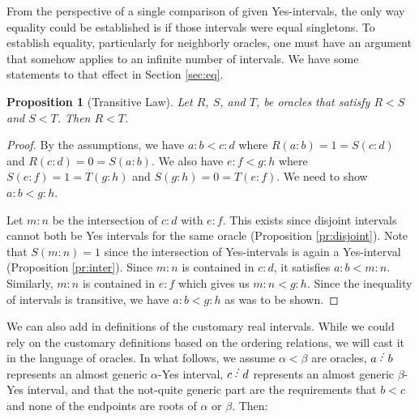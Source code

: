 \documentclass[12pt]{article}
\newtheorem{proposition}{Proposition}[subsection]
\begin{document}
From the perspective of a single comparison of given Yes-intervals, the only way equality could be established is if those intervals were equal singletons. To establish equality, particularly for neighborly oracles, one must have an argument that somehow applies to an infinite number of intervals. We have some statements to that effect in Section \ref{sec:eq}. 

\begin{proposition}[Transitive Law]\label{pr:transitive}
Let $R$, $S$, and $T$, be oracles that satisfy $R<S$ and $S < T$. Then $R < T$.
\end{proposition}

\begin{proof}
By the assumptions, we have $a:b < c:d$ where $R(a:b) = 1 = S(c:d)$ and $R(c:d) = 0 = S(a:b)$. We also have $e:f < g:h$ where $S(e:f) = 1 = T(g:h)$ and $S(g:h) = 0 = T(e:f)$. We need to show $a:b < g:h$.

Let $m:n$ be the intersection of $c:d$ with $e:f$. This exists since disjoint intervals cannot both be Yes intervals for the same oracle (Proposition \ref{pr:disjoint}). Note that $S(m:n) = 1$ since the intersection of Yes-intervals is again a Yes-interval (Proposition \ref{pr:inter}). Since $m:n$ is contained in $c:d$, it satisfies $a:b < m:n$. Similarly, $m:n$ is contained in $e:f$ which gives us $m:n < g:h$. Since the inequality of intervals is transitive, we have $a:b < g:h$ as was to be shown. 
\end{proof}

We can also add in definitions of the customary real intervals. While we could rely on the customary definitions based on the ordering relations, we will cast it in the language of oracles. In what follows, we assume $\alpha < \beta$ are oracles,  $a\lte b$ represents an almost generic $\alpha$-Yes interval, $c\lte d$ represents an almost generic $\beta$-Yes interval, and that the not-quite generic part are the requirements that $b < c$ and none of the endpoints are roots of $\alpha$ or $\beta$. Then: 
\end{document}

